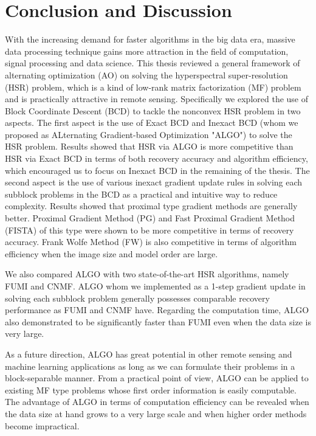 \chapter{Conclusion and Discussion}
With the increasing demand for faster algorithms in the big data era, massive
data processing technique gains more attraction in the field of computation,
signal processing and data science.
This thesis reviewed a general framework of alternating optimization (AO) on
solving the hyperspectral super-resolution (HSR) problem, which is a kind of
low-rank matrix factorization (MF) problem and is practically attractive in
remote sensing.
Specifically we explored the use of Block Coordinate Descent (BCD) to tackle
the nonconvex HSR problem in two aspects.
The first aspect is the use of Exact BCD and Inexact BCD (whom we proposed as
ALternating Gradient-based Optimization "ALGO") to solve the HSR problem.
Results showed that HSR via ALGO is more competitive than HSR via Exact BCD in
terms of both recovery accuracy and algorithm efficiency, which encouraged us
to focus on Inexact BCD in the remaining of the thesis.
The second aspect is the use of various inexact gradient update rules in
solving each subblock problems in the BCD as a practical and intuitive way to
reduce complexity.
Results showed that proximal type gradient methods are generally better.
Proximal Gradient Method (PG) and Fast Proximal Gradient Method (FISTA) of
this type were shown to be more competitive in terms of recovery accuracy.
Frank Wolfe Method (FW) is also competitive in terms of algorithm efficiency
when the image size and model order are large.

We also compared ALGO with two state-of-the-art HSR algorithms, namely FUMI
and CNMF.
ALGO whom we implemented as a 1-step gradient update in solving each subblock
problem generally possesses comparable recovery performance as FUMI and CNMF
have.
Regarding the computation time, ALGO also demonstrated to be significantly
faster than FUMI even when the data size is very large.

As a future direction, ALGO has great potential in other remote sensing and
machine learning applications as long as we can formulate their problems in a
block-separable manner.
From a practical point of view, ALGO can be applied to existing MF type
problems whose first order information is easily computable.
The advantage of ALGO in terms of computation efficiency can be revealed when
the data size at hand grows to a very large scale and when higher order
methods become impractical.
